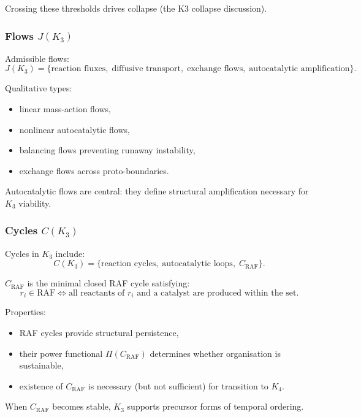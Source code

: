 Crossing these thresholds drives collapse (the K3 collapse discussion).

\subsubsection{Flows \texorpdfstring{$J(K_3)$}{J(K_3)}}

Admissible flows:
\[
J(K_3) = \{\text{reaction fluxes},\; \text{diffusive transport},\;
         \text{exchange flows},\; \text{autocatalytic amplification}\}.
\]

Qualitative types:
\begin{itemize}
    \item linear mass-action flows,
    \item nonlinear autocatalytic flows,
    \item balancing flows preventing runaway instability,
    \item exchange flows across proto-boundaries.
\end{itemize}

Autocatalytic flows are central: they define structural amplification
necessary for $K_3$ viability.

\subsubsection{Cycles \texorpdfstring{$C(K_3)$}{C(K_3)}}

Cycles in $K_3$ include:
\[
C(K_3) = \{\text{reaction cycles},\;
           \text{autocatalytic loops},\;
           C_{\mathrm{RAF}}\}.
\]

$C_{\mathrm{RAF}}$ is the minimal closed RAF cycle satisfying:
\[
r_i \in \text{RAF} \iff \text{all reactants of $r_i$ and a catalyst
are produced within the set.}
\]

Properties:
\begin{itemize}
    \item RAF cycles provide structural persistence,
    \item their power functional $\Pi(C_{\mathrm{RAF}})$ determines
          whether organisation is sustainable,
    \item existence of $C_{\mathrm{RAF}}$ is necessary (but not
          sufficient) for transition to $K_4$.
\end{itemize}

When $C_{\mathrm{RAF}}$ becomes stable, $K_3$ supports precursor forms of
temporal ordering.

